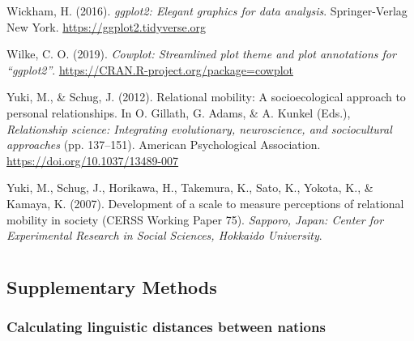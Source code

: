 \documentclass[
  man,floatsintext]{apa6}
\newlength{\cslhangindent}
\newlength{\cslentryspacingunit} %
\newenvironment{CSLReferences}[2] %
 {%
  \setlength{\parindent}{0pt}
  \ifodd #1
  \let\oldpar\par
  \def\par{\hangindent=\cslhangindent\oldpar}
  \fi
  \setlength{\parskip}{#2\cslentryspacingunit}
 }%
 {}
\begin{document}
\begin{CSLReferences}{1}{0}
\leavevmode{}%
Wickham, H. (2016). \emph{{ggplot2}: Elegant graphics for data analysis}. Springer-Verlag New York. \url{https://ggplot2.tidyverse.org}

\leavevmode{}%
Wilke, C. O. (2019). \emph{Cowplot: Streamlined plot theme and plot annotations for {``{ggplot2}''}}. \url{https://CRAN.R-project.org/package=cowplot}

\leavevmode{}%
Yuki, M., \& Schug, J. (2012). Relational mobility: A socioecological approach to personal relationships. In O. Gillath, G. Adams, \& A. Kunkel (Eds.), \emph{Relationship science: Integrating evolutionary, neuroscience, and sociocultural approaches} (pp. 137--151). American Psychological Association. \url{https://doi.org/10.1037/13489-007}

\leavevmode{}%
Yuki, M., Schug, J., Horikawa, H., Takemura, K., Sato, K., Yokota, K., \& Kamaya, K. (2007). Development of a scale to measure perceptions of relational mobility in society ({CERSS Working Paper 75}). \emph{Sapporo, Japan: Center for Experimental Research in Social Sciences, Hokkaido University}.

\end{CSLReferences}

\endgroup

\newpage

\hypertarget{appendix-appendix}{%
\appendix}


\renewcommand{\appendixname}{\bf{Supplementary Materials}}
\renewcommand{\thefigure}{S\arabic{figure}} \setcounter{figure}{0}
\renewcommand{\thetable}{S\arabic{table}} \setcounter{table}{0}
\renewcommand{\theequation}{S\arabic{table}} \setcounter{equation}{0}

\hypertarget{section}{%
\section{}\label{section}}

\hypertarget{supplementary-methods}{%
\subsection{Supplementary Methods}\label{supplementary-methods}}

\hypertarget{calculating-linguistic-distances-between-nations}{%
\subsubsection{Calculating linguistic distances between nations}\label{calculating-linguistic-distances-between-nations}}
\end{document}

